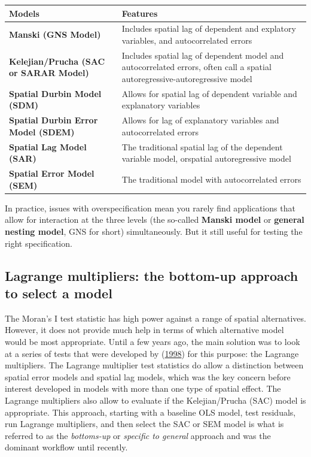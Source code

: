 \documentclass[
  krantz2]{krantz}
\begin{document}
\begin{table}
\centering
\begin{tabular}[t]{>{}l||>{\raggedright\arraybackslash}p{30em}}
\hline
Models & Features\\
\hline
\textbf{Manski (GNS Model)} & Includes spatial lag of dependent and explatory variables, and autocorrelated errors\\
\hline
\textbf{Kelejian/Prucha (SAC or SARAR Model)} & Includes spatial lag of dependent model and autocorrelated errors, often call a spatial autoregressive-autoregressive model\\
\hline
\textbf{Spatial Durbin Model (SDM)} & Allows for spatial lag of dependent variable and explanatory variables\\
\hline
\textbf{Spatial Durbin Error Model (SDEM)} & Allows for lag of explanatory variables and autocorrelated errors\\
\hline
\textbf{Spatial Lag Model (SAR)} & The traditional spatial lag of the dependent variable model, orspatial autoregressive model\\
\hline
\textbf{Spatial Error Model (SEM)} & The traditional model with autocorrelated errors\\
\hline
\end{tabular}
\end{table}

In practice, issues with overspecification mean you rarely find applications that allow for interaction at the three levels (the so-called \textbf{Manski model} or \textbf{general nesting model}, GNS for short) simultaneously. But it still useful for testing the right specification.

\hypertarget{lagrange-multipliers-the-bottom-up-approach-to-select-a-model}{%
\subsection{Lagrange multipliers: the bottom-up approach to select a model}\label{lagrange-multipliers-the-bottom-up-approach-to-select-a-model}}

The Moran's I test statistic has high power against a range of spatial alternatives. However, it does not provide much help in terms of which alternative model would be most appropriate. Until a few years ago, the main solution was to look at a series of tests that were developed by (\protect\hyperlink{ref-Anselin_1998}{1998}) for this purpose: the Lagrange multipliers. The Lagrange multiplier test statistics do allow a distinction between spatial error models and spatial lag models, which was the key concern before interest developed in models with more than one type of spatial effect. The Lagrange multipliers also allow to evaluate if the Kelejian/Prucha (SAC) model is appropriate. This approach, starting with a baseline OLS model, test residuals, run Lagrange multipliers, and then select the SAC or SEM model is what is referred to as the \emph{bottoms-up} or \emph{specific to general} approach and was the dominant workflow until recently.
\end{document}
